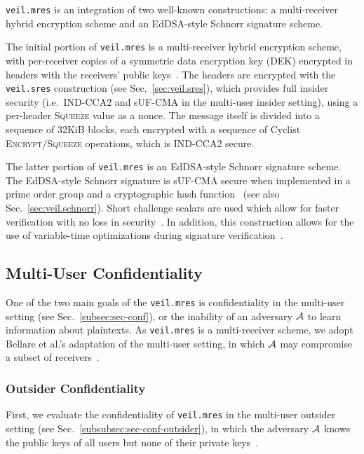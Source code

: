 \texttt{veil.mres} is an integration of two well-known constructions: a multi-receiver hybrid
encryption scheme and an EdDSA-style Schnorr signature scheme.

The initial portion of \texttt{veil.mres} is a multi-receiver hybrid encryption scheme, with
per-receiver copies of a symmetric data encryption key \@(DEK) encrypted in headers with the
receivers' public keys~\cite{kurosawa2002, bellare2003, bellare2007, rfc4880}\@.
The headers are encrypted with the \texttt{veil.sres} construction (see Sec.~\ref{sec:veil.sres}),
which provides full insider security (i.e.\ IND-CCA2 and sUF-CMA in the multi-user insider setting),
using a per-header \textsc{Squeeze} value as a nonce.
The message itself is divided into a sequence of 32KiB blocks, each encrypted with a sequence of
Cyclist \textsc{Encrypt}\@/\textsc{Squeeze} operations, which is IND-CCA2 secure.

The latter portion of \texttt{veil.mres} is an EdDSA-style Schnorr signature scheme.
The EdDSA-style Schnorr signature is sUF-CMA secure when implemented in a prime order group and a
cryptographic hash function~\cite{brendel2021, chalkias2020, pointcheval2000, neven2009} \@(see also
Sec.~\ref{sec:veil.schnorr})\@.
Short challenge scalars are used which allow for faster verification with no loss in
security~\cite{pornin2022}.
In addition, this construction allows for the use of variable-time optimizations during signature
verification~\cite{pornin2020schnorr}.

\subsection{Multi-User Confidentiality}\label{subsec:veil.mres-conf}

One of the two main goals of the \texttt{veil.mres} is confidentiality in the multi-user setting
(see Sec.~\ref{subsec:sec-conf}), or the inability of an adversary $\mathcal{A}$ to learn information
about plaintexts.
As \texttt{veil.mres} is a multi-receiver scheme, we adopt Bellare et al.'s adaptation of the multi-user
setting, in which $\mathcal{A}$ may compromise a subset of receivers~\cite{bellare2007}\@.

\subsubsection{Outsider Confidentiality}

First, we evaluate the confidentiality of \texttt{veil.mres} in the multi-user outsider setting (see
Sec.~\ref{subsubsec:sec-conf-outsider}), in which the adversary $\mathcal{A}$ knows the public keys
of all users but none of their private keys~\cite[p. 44]{baek2010}\@.


